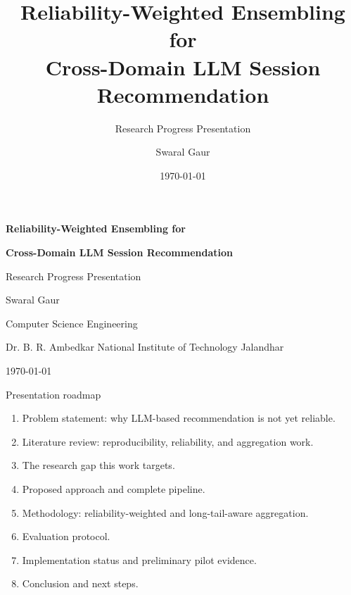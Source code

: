 \documentclass[aspectratio=169,12pt]{beamer}
\title[RWRA for Cross-Domain LLM SR]{Reliability-Weighted Ensembling for\\Cross-Domain LLM Session Recommendation}
\subtitle{Research Progress Presentation}
\author{Swaral Gaur}
\institute{Computer Science Engineering / Dr. B. R. Ambedkar National Institute of Technology Jalandhar}
\date{\today}
\begin{document}
\begin{frame}[plain]
\centering
\vspace{0.5cm}
{\color{DeepBlue}\bfseries\LARGE
Reliability-Weighted Ensembling for\par}
{\color{DeepBlue}\bfseries\LARGE
Cross-Domain LLM Session Recommendation\par}
\vspace{0.4cm}
{\color{Muted}\large Research Progress Presentation\par}
\vfill
{\large Swaral Gaur\par}
\vspace{0.15cm}
{\normalsize Computer Science Engineering\par}
{\normalsize Dr. B. R. Ambedkar National Institute of Technology Jalandhar\par}
\vspace{0.15cm}
{\normalsize \today\par}
\end{frame}

\begin{frame}{Presentation roadmap}
\begin{enumerate}
  \item Problem statement: why LLM-based recommendation is not yet reliable.
  \item Literature review: reproducibility, reliability, and aggregation work.
  \item The research gap this work targets.
  \item Proposed approach and complete pipeline.
  \item Methodology: reliability-weighted and long-tail-aware aggregation.
  \item Evaluation protocol.
  \item Implementation status and preliminary pilot evidence.
  \item Conclusion and next steps.
\end{enumerate}
\end{frame}
\end{document}
